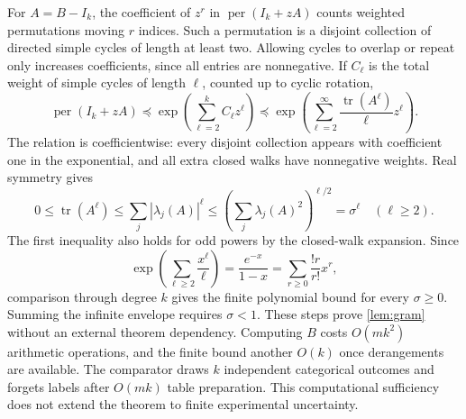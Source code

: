 \documentclass[11pt,a4paper]{article}
\theoremstyle{remark}\newtheorem{remark}[theorem]{Remark}
\DeclareMathOperator{\per}{per}
\begin{document}
For $A=B-I_k$, the coefficient of $z^r$ in $\per(I_k+zA)$ counts weighted permutations moving $r$ indices. Such a permutation is a disjoint collection of directed simple cycles of length at least two. Allowing cycles to overlap or repeat only increases coefficients, since all entries are nonnegative. If $C_\ell$ is the total weight of simple cycles of length $\ell$, counted up to cyclic rotation,
\begin{equation}
 \per(I_k+zA)\preceq\exp\left(\sum_{\ell=2}^k C_\ell z^\ell\right)
 \preceq\exp\left(\sum_{\ell=2}^\infty\frac{\operatorname{tr}(A^\ell)}\ell z^\ell\right).
\end{equation}
The relation is coefficientwise: every disjoint collection appears with coefficient one in the exponential, and all extra closed walks have nonnegative weights. Real symmetry gives
\begin{equation}
 0\le\operatorname{tr}(A^\ell)\le\sum_j|\lambda_j(A)|^\ell
 \le\left(\sum_j\lambda_j(A)^2\right)^{\ell/2}=\sigma^\ell\quad(\ell\ge2).
\end{equation}
The first inequality also holds for odd powers by the closed-walk expansion. Since
\begin{equation}
 \exp\left(\sum_{\ell\ge2}\frac{x^\ell}{\ell}\right)
 =\frac{e^{-x}}{1-x}=\sum_{r\ge0}\frac{!r}{r!}x^r,
\end{equation}
comparison through degree $k$ gives the finite polynomial bound for every $\sigma\ge0$. Summing the infinite envelope requires $\sigma<1$. These steps prove \cref{lem:gram} without an external theorem dependency. Computing $B$ costs $O(mk^2)$ arithmetic operations, and the finite bound another $O(k)$ once derangements are available. The comparator draws $k$ independent categorical outcomes and forgets labels after $O(mk)$ table preparation. This computational sufficiency does not extend the theorem to finite experimental uncertainty.
\end{document}

